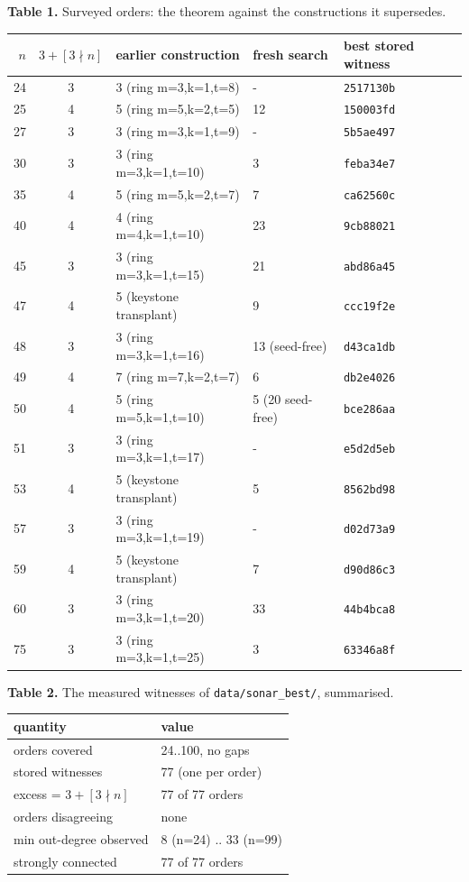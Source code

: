 \textbf{Table 1.} Surveyed orders: the theorem against the constructions it supersedes.\par\smallskip
\begin{tabular}{rclll}
$n$ & $3+[3\nmid n]$ & earlier construction & fresh search & best stored witness \\ \hline
24 & 3 & 3 (ring m=3,k=1,t=8) & - & \texttt{2517130b} \\
25 & 4 & 5 (ring m=5,k=2,t=5) & 12 & \texttt{150003fd} \\
27 & 3 & 3 (ring m=3,k=1,t=9) & - & \texttt{5b5ae497} \\
30 & 3 & 3 (ring m=3,k=1,t=10) & 3 & \texttt{feba34e7} \\
35 & 4 & 5 (ring m=5,k=2,t=7) & 7 & \texttt{ca62560c} \\
40 & 4 & 4 (ring m=4,k=1,t=10) & 23 & \texttt{9cb88021} \\
45 & 3 & 3 (ring m=3,k=1,t=15) & 21 & \texttt{abd86a45} \\
47 & 4 & 5 (keystone transplant) & 9 & \texttt{ccc19f2e} \\
48 & 3 & 3 (ring m=3,k=1,t=16) & 13 (seed-free) & \texttt{d43ca1db} \\
49 & 4 & 7 (ring m=7,k=2,t=7) & 6 & \texttt{db2e4026} \\
50 & 4 & 5 (ring m=5,k=1,t=10) & 5 (20 seed-free) & \texttt{bce286aa} \\
51 & 3 & 3 (ring m=3,k=1,t=17) & - & \texttt{e5d2d5eb} \\
53 & 4 & 5 (keystone transplant) & 5 & \texttt{8562bd98} \\
57 & 3 & 3 (ring m=3,k=1,t=19) & - & \texttt{d02d73a9} \\
59 & 4 & 5 (keystone transplant) & 7 & \texttt{d90d86c3} \\
60 & 3 & 3 (ring m=3,k=1,t=20) & 33 & \texttt{44b4bca8} \\
75 & 3 & 3 (ring m=3,k=1,t=25) & 3 & \texttt{63346a8f} \\
\end{tabular}
\par\medskip
\textbf{Table 2.} The measured witnesses of \texttt{data/sonar\_best/}, summarised.\par\smallskip
\begin{tabular}{ll}
quantity & value \\ \hline
orders covered & 24..100, no gaps \\
stored witnesses & 77 (one per order) \\
excess = $3+[3\nmid n]$ & 77 of 77 orders \\
orders disagreeing & none \\
min out-degree observed & 8 (n=24) .. 33 (n=99) \\
strongly connected & 77 of 77 orders \\
\end{tabular}

